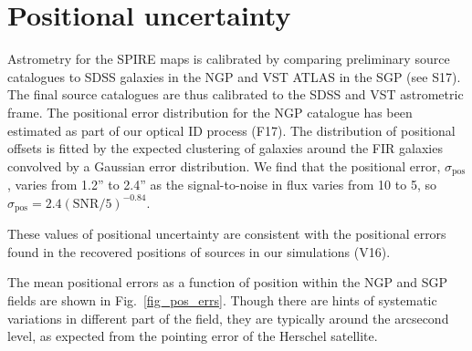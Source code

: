 \documentclass[useAMS,usenatbib]{mn2e}
\begin{document}
\section{Positional uncertainty} 

Astrometry for the SPIRE maps is calibrated by comparing preliminary
source catalogues to SDSS galaxies in the NGP and VST ATLAS in the SGP
(see S17). The final source catalogues are thus calibrated to the SDSS
and VST astrometric frame. The positional error distribution for the
NGP catalogue has been estimated as part of our optical ID process
(F17). The distribution of positional offsets is fitted by the
expected clustering of galaxies around the FIR galaxies convolved by a
Gaussian error distribution. We find that the positional error,
$\sigma_\mathrm{pos}$, varies from 1.2'' to 2.4'' as the
signal-to-noise in flux varies from 10 to 5, so $\sigma_\mathrm{pos} =
2.4 (\mathrm{SNR}/5)^{-0.84}$.

These values of positional uncertainty are consistent with the
positional errors found in the recovered positions of sources in our
simulations (V16). 




The mean positional errors as a function of position within the NGP
and SGP fields are shown in Fig.~\ref{fig_pos_errs}. Though there are
hints of systematic variations in different part of the field, they
are typically around the arcsecond level, as expected from the
pointing error of the Herschel satellite. 
\end{document}
